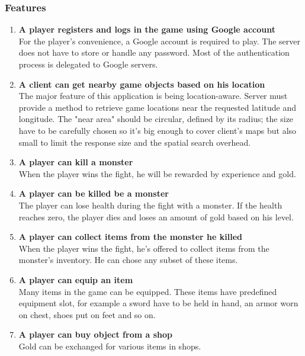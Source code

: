 		\subsubsection{Features}
		\begin{enumerate}
			\item \textbf{A player registers and logs in the game using Google account} \\
			For the player's convenience, a Google account is required to play. The server does not have to store or handle any password. Most of the authentication process is delegated to Google servers.
			
			\item \textbf{A client can get nearby game objects based on his location} \\
			The major feature of this application is being location-aware. Server must provide a method to retrieve game locations near the requested latitude and longitude. The "near area" should be circular, defined by its radius; the size have to be carefully chosen so it's big enough to cover client's maps but also small to limit the response size and the spatial search overhead.
			
			\item \textbf{A player can kill a monster} \\
			When the player wins the fight, he will be rewarded by experience and gold. 			
			
			\item \textbf{A player can be killed be a monster} \\
			The player can lose health during the fight with a monster. If the health reaches zero, the player dies and loses an amount of gold based on his level.
			
			\item \textbf{A player can collect items from the monster he killed} \\
			When the player wins the fight, he's offered to collect items from the monster's inventory. He can chose any subset of these items.
			
			\item \textbf{A player can equip an item} \\	
			Many items in the game can be equipped. These items have predefined equipment slot, for example a sword have to be held in hand, an armor worn on chest, shoes put on feet and so on.
						
			\item \textbf{A player can buy object from a shop} \\
			Gold can be exchanged for various items in shops.
			

\end{enumerate}
